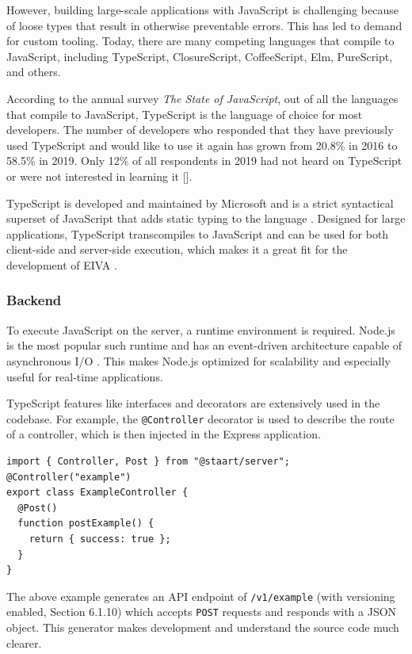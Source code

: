 \documentclass{article}
\begin{document}
However, building large-scale applications with JavaScript is challenging because of loose types that result in otherwise preventable errors. This has led to demand for custom tooling. Today, there are many competing languages that compile to JavaScript, including TypeScript, ClosureScript, CoffeeScript, Elm, PureScript, and others.

According to the annual survey \emph{The State of JavaScript}, out of all the languages that compile to JavaScript, TypeScript is the language of choice for most developers. The number of developers who responded that they have previously used TypeScript and would like to use it again has grown from 20.8\% in 2016 to 58.5\% in 2019. Only 12\% of all respondents in 2019 had not heard on TypeScript or were not interested in learning it [].

TypeScript is developed and maintained by Microsoft and is a strict syntactical superset of JavaScript that adds static typing to the language \cite{hutchison_understanding_2014}. Designed for large applications, TypeScript transcompiles to JavaScript and can be used for both client-side and server-side execution, which makes it a great fit for the development of EIVA \cite{huisman_inference_2017}.

\subsubsection{Backend}

To execute JavaScript on the server, a runtime environment is required. Node.js is the most popular such runtime and has an event-driven architecture capable of asynchronous I/O \cite{kaimer_return_2018}. This makes Node.js optimized for scalability and especially useful for real-time applications.

TypeScript features like interfaces and decorators are extensively used in the codebase. For example, the \texttt{@Controller} decorator is used to describe the route of a controller, which is then injected in the Express application.

\begin{verbatim}
import { Controller, Post } from "@staart/server";
@Controller("example")
export class ExampleController {
  @Post()
  function postExample() {
    return { success: true };
  }
}
\end{verbatim}

The above example generates an API endpoint of \texttt{/v1/example} (with versioning enabled, Section 6.1.10) which accepts \texttt{POST} requests and responds with a JSON object. This generator makes development and understand the source code much clearer.
\end{document}
